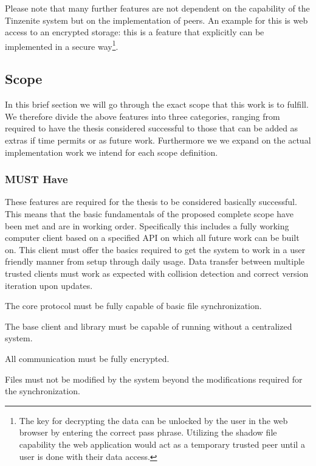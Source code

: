 Please note that many further features are not dependent on the capability of the Tinzenite system but on the implementation of peers.
An example for this is web access to an encrypted storage: this is a feature that explicitly can be implemented in a secure way\footnote{The key for decrypting the data can be unlocked by the user in the web browser by entering the correct pass phrase. Utilizing the shadow file capability the web application would act as a temporary trusted peer until a user is done with their data access.}.

\subsection{Scope}

In this brief section we will go through the exact scope that this work is to fulfill.
We therefore divide the above features into three categories, ranging from required to have the thesis considered successful to those that can be added as extras if time permits or as future work.
Furthermore we we expand on the actual implementation work we intend for each scope definition.

\subsubsection{MUST Have}
\label{subs:MUST Have}

These features are required for the thesis to be considered basically successful.
This means that the basic fundamentals of the proposed complete scope have been met and are in working order.
Specifically this includes a fully working computer client based on a specified API on which all future work can be built on.
This client must offer the basics required to get the system to work in a user friendly manner from setup through daily usage.
Data transfer between multiple trusted clients must work as expected with collision detection and correct version iteration upon updates.

\begin{description}[leftmargin=16em,style=nextline,noitemsep,nolistsep]
\item[File Synchronization Protocol]
    The core protocol must be fully capable of basic file synchronization.
\item[Peer to Peer Architecture]
    The base client and library must be capable of running without a centralized system.
\item[Secure Transport]
    All communication must be fully encrypted.
\item[Object Atomicity]
    Files must not be modified by the system beyond the modifications required for the synchronization.
\end{description}

